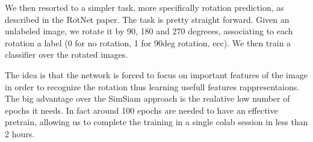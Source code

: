 \documentclass{article}
\begin{document}
\begin{flushleft}
We then resorted to a simpler task, more specifically rotation prediction, 
as described in the RotNet paper. The task is pretty straight forward. 
Given an unlabeled image, we rotate it by 90, 180 and 270 degreees, 
associating to each rotation a label (0 for no rotation, 1 for 90deg rotation, ecc). 
We then train a classifier over the rotated images. 
\end{flushleft}
\begin{flushleft}
The idea is that the network is forced to focus on important features 
of the image in order to recognize the rotation thus learning usefull features 
rappresentaions. The big advantage over the SimSiam approach is the realative low number of epochs it needs. 
In fact around 100 epochs are needed to have an effective pretrain, allowing us to complete the training in a 
single colab session in less than 2 hours.
\end{flushleft}
\end{document}
